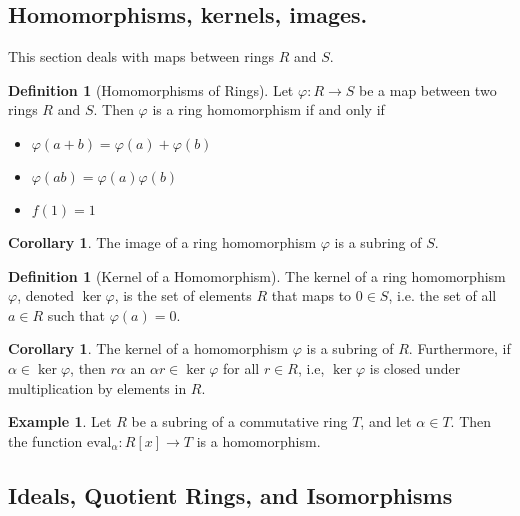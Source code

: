 \documentclass[10pt, oneside, reqno]{amsart}
\theoremstyle{plain}%
\theoremstyle{definition}
\newtheorem{defn}[thm]{Definition}
\newtheorem{exmp}[thm]{Example}
\newtheorem{cor}[thm]{Corollary}
\theoremstyle{remark}
\newcommand{\al}{\alpha}
\begin{document}
\subsection{Homomorphisms, kernels, images.} %
\label{sub:homomorphisms_kernels_images_}
This section deals with maps between rings $R$ and $S$.

\begin{defn}[Homomorphisms of Rings]
    Let $\varphi: R \rightarrow S$ be a map between two rings $R$ and $S$.  Then $\varphi$ is a ring homomorphism if and only if
    \begin{itemize}
        \item $\varphi(a + b) = \varphi(a) + \varphi(b)$
        \item $\varphi(ab) = \varphi(a) \varphi(b)$
        \item $f(1) = 1$
    \end{itemize}
\end{defn}

\begin{cor}
    The image of a ring homomorphism $\varphi$ is a subring of $S$.
\end{cor}
\begin{defn}[Kernel of a Homomorphism]
    The kernel of a ring homomorphism $\varphi$, denoted $\ker \varphi$, is the set of elements $R$ that maps to $0 \in S$, i.e. the set of all $a \in R$ such that $\varphi(a) = 0$.
\end{defn}

\begin{cor}
    The kernel of a homomorphism $\varphi$ is a subring of $R$.  Furthermore, if $\al \in \ker \varphi$, then $r \al$ an $\al r \in \ker \varphi$ for all $r \in R$, i.e, $\ker \varphi$ is closed under multiplication by elements in $R$. 
\end{cor}

\begin{exmp}
    Let $R$ be a subring of a commutative ring $T$, and let $\al \in T$.  Then the function $\text{eval}_\alpha : R[x] \rightarrow T$ is a homomorphism.
\end{exmp}



\subsection{Ideals, Quotient Rings, and Isomorphisms} %
\label{sub:ideals_quotient_rings_and_isomorphisms}
\end{document}
